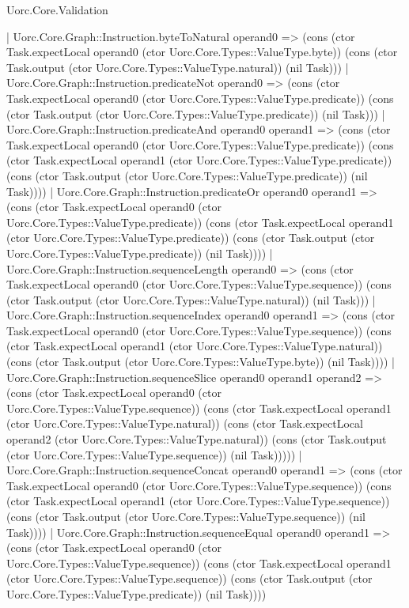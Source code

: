 \begin{lexlean}{Uorc.Core.Validation}
\begin{semanticmodule}
{    | Uorc.Core.Graph::Instruction.byteToNatural operand0 => (cons (ctor Task.expectLocal operand0 (ctor Uorc.Core.Types::ValueType.byte)) (cons (ctor Task.output (ctor Uorc.Core.Types::ValueType.natural)) (nil Task)))
    | Uorc.Core.Graph::Instruction.predicateNot operand0 => (cons (ctor Task.expectLocal operand0 (ctor Uorc.Core.Types::ValueType.predicate)) (cons (ctor Task.output (ctor Uorc.Core.Types::ValueType.predicate)) (nil Task)))
    | Uorc.Core.Graph::Instruction.predicateAnd operand0 operand1 => (cons (ctor Task.expectLocal operand0 (ctor Uorc.Core.Types::ValueType.predicate)) (cons (ctor Task.expectLocal operand1 (ctor Uorc.Core.Types::ValueType.predicate)) (cons (ctor Task.output (ctor Uorc.Core.Types::ValueType.predicate)) (nil Task))))
    | Uorc.Core.Graph::Instruction.predicateOr operand0 operand1 => (cons (ctor Task.expectLocal operand0 (ctor Uorc.Core.Types::ValueType.predicate)) (cons (ctor Task.expectLocal operand1 (ctor Uorc.Core.Types::ValueType.predicate)) (cons (ctor Task.output (ctor Uorc.Core.Types::ValueType.predicate)) (nil Task))))
    | Uorc.Core.Graph::Instruction.sequenceLength operand0 => (cons (ctor Task.expectLocal operand0 (ctor Uorc.Core.Types::ValueType.sequence)) (cons (ctor Task.output (ctor Uorc.Core.Types::ValueType.natural)) (nil Task)))
    | Uorc.Core.Graph::Instruction.sequenceIndex operand0 operand1 => (cons (ctor Task.expectLocal operand0 (ctor Uorc.Core.Types::ValueType.sequence)) (cons (ctor Task.expectLocal operand1 (ctor Uorc.Core.Types::ValueType.natural)) (cons (ctor Task.output (ctor Uorc.Core.Types::ValueType.byte)) (nil Task))))
    | Uorc.Core.Graph::Instruction.sequenceSlice operand0 operand1 operand2 => (cons (ctor Task.expectLocal operand0 (ctor Uorc.Core.Types::ValueType.sequence)) (cons (ctor Task.expectLocal operand1 (ctor Uorc.Core.Types::ValueType.natural)) (cons (ctor Task.expectLocal operand2 (ctor Uorc.Core.Types::ValueType.natural)) (cons (ctor Task.output (ctor Uorc.Core.Types::ValueType.sequence)) (nil Task)))))
    | Uorc.Core.Graph::Instruction.sequenceConcat operand0 operand1 => (cons (ctor Task.expectLocal operand0 (ctor Uorc.Core.Types::ValueType.sequence)) (cons (ctor Task.expectLocal operand1 (ctor Uorc.Core.Types::ValueType.sequence)) (cons (ctor Task.output (ctor Uorc.Core.Types::ValueType.sequence)) (nil Task))))
    | Uorc.Core.Graph::Instruction.sequenceEqual operand0 operand1 => (cons (ctor Task.expectLocal operand0 (ctor Uorc.Core.Types::ValueType.sequence)) (cons (ctor Task.expectLocal operand1 (ctor Uorc.Core.Types::ValueType.sequence)) (cons (ctor Task.output (ctor Uorc.Core.Types::ValueType.predicate)) (nil Task))))
}
\end{semanticmodule}
\end{lexlean}
